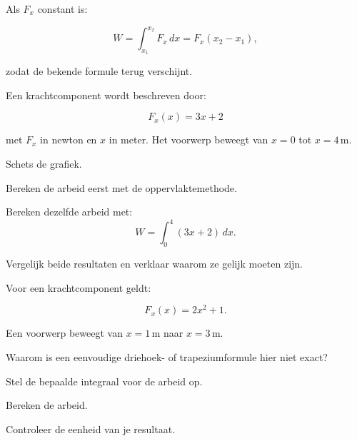 \documentclass{ximera}
\begin{document}
Als $F_x$ constant is:

\[
W=\int_{x_1}^{x_2}F_x\,dx
=F_x(x_2-x_1),
\]

zodat de bekende formule terug verschijnt.


\begin{oefening}{\oefU\ESS}

Een krachtcomponent wordt beschreven door:

\[
F_x(x)=3x+2
\]

met $F_x$ in newton en $x$ in meter. Het voorwerp beweegt van $x=0$ tot
$x=4\,\mathrm m$.

\begin{question}
Schets de grafiek.
\end{question}

\begin{question}
Bereken de arbeid eerst met de oppervlaktemethode.
\end{question}

\begin{question}
Bereken dezelfde arbeid met:
\[
W=\int_0^4(3x+2)\,dx.
\]
\end{question}

\begin{question}
Vergelijk beide resultaten en verklaar waarom ze gelijk moeten zijn.
\end{question}

\end{oefening}


\begin{oefening}{\oefU\ESS}

Voor een krachtcomponent geldt:

\[
F_x(x)=2x^2+1.
\]

Een voorwerp beweegt van $x=1\,\mathrm m$ naar $x=3\,\mathrm m$.

\begin{question}
Waarom is een eenvoudige driehoek- of trapeziumformule hier niet exact?
\end{question}

\begin{question}
Stel de bepaalde integraal voor de arbeid op.
\end{question}

\begin{question}
Bereken de arbeid.
\end{question}

\begin{question}
Controleer de eenheid van je resultaat.
\end{question}

\end{oefening}
\end{document}
